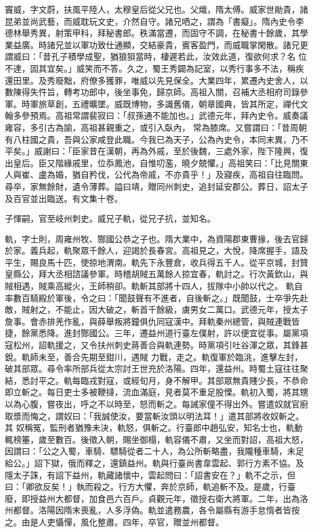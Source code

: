 \begin{pinyinscope}
 竇威，字文蔚，扶風平陸人，太穆皇后從父兄也。父熾，隋太傅。威家世勛貴，諸昆弟並尚武藝，而威耽玩文史，介然自守。諸兄哂之，謂為「書癡」。隋內史令李德林舉秀異，射策甲科，拜秘書郎。秩滿當遷，而固守不調，在秘書十餘歲，其學業益廣。時諸兄並以軍功致仕通顯，交結豪貴，賓客盈門，而威職掌閑散。諸兄更謂威曰：「昔孔子積學成聖，猶狼狽當時，棲遲若此，汝效此道，復欲何求？名
 位不達，固其宜矣。」威笑而不答。久之，蜀王秀闢為記室，以秀行事多不法，稱疾還田里。及秀廢黜，府僚多獲罪，唯威以先見保全。大業四年，累遷內史舍人，以數陳得失忤旨，轉考功郎中，後坐事免，歸京師。高祖入關，召補大丞相府司錄參軍。時軍旅草創，五禮曠墜。威既博物，多識舊儀，朝章國典，皆其所定，禪代文翰多參預焉。高祖常謂裴寂曰：「叔孫通不能加也。」武德元年，拜內史令。威奏議雍容，多引古為諭，高祖甚親重之，或引入臥內，
 常為膝席。又嘗謂曰：「昔周朝有八柱國之貴，吾與公家咸登此職。今我已為天子，公為內史令，本同末異，乃不平矣。」威謝曰：「臣家昔在漢朝，再為外戚，至於後魏，三處外家，陛下隆興，復出皇后。臣又階緣戚里，位忝鳳池，自惟叨濫，曉夕兢懼。」高祖笑曰：「比見關東人與崔、盧為婚，猶自矜伐，公代為帝戚，不亦貴乎！」及寢疾，高祖自往臨問。尋卒，家無餘財，遺令薄葬。謚曰靖，贈同州刺史，追封延安郡公。葬日，詔太子及百官並出臨送。有文集十卷。



 子惲嗣，官至岐州刺史。威兄子軌，從兄子抗，並知名。



 軌，字士則，周雍州牧、酂國公恭之子也。隋大業中，為資陽郡東曹掾，後去官歸於家。義兵起，軌聚眾千餘人，迎謁於長春宮。高祖見之，大悅，降席握手，語及平生，賜良馬十匹，使掠地渭南。軌先下永豐倉，收兵得五千人。從平京城，封贊皇縣公，拜大丞相諮議參軍。時稽胡賊五萬餘人掠宜春，軌討之。行次黃欽山，與賊相遇，賊乘高縱火，王師稍卻。軌斬其部將十四人，拔隊中小帥以代之。
 軌自率數百騎殿於軍後，令之曰：「聞鼓聲有不進者，自後斬之。」既聞鼓，士卒爭先赴敵，賊射之，不能止，因大破之，斬首千餘級，虜男女二萬口。武德元年，授太子詹事。會赤排羌作亂，與薛舉叛將鐘俱仇同寇漢中。拜軌秦州總管，與賊連戰皆捷，餘黨悉降。進封酂國公。三年，遷益州道行臺左僕射，許以便宜從事。屬黨項寇松州，詔軌援之，又令扶州刺史蔣善合與軌連勢。時黨項引吐谷渾之眾，其鋒甚銳。軌師未至，善合先期至鉗川，遇賊
 力戰，走之。軌復軍於臨洮，進擊左封，破其部眾。尋令率所部兵從太宗討王世充於洛陽。四年，還益州。時蜀土寇往往聚結，悉討平之。軌每臨戎對寇，或經旬月，身不解甲。其部眾無貴賤少長，不恭命即立斬之。每日吏士多被鞭撻，流血滿庭，見者莫不重足股慄。軌初入蜀，將其甥以為心腹，嘗夜出，呼之不以時至，怒而斬之。每誡家僮不得出外。嘗遣奴就官廚取漿而悔之，謂奴曰：「我誠使汝，要當斬汝頭以明法耳！」遣其部將收奴斬之。其
 奴稱冤，監刑者猶豫未決，軌怒，俱斬之。行臺郎中趙弘安，知名士也，軌動輒榜箠，歲至數百。後徵入朝，賜坐御榻，軌容儀不肅，又坐而對詔，高祖大怒，因謂曰：「公之入蜀，車騎、驃騎從者二十人，為公所斬略盡，我隴種車騎，未足給公。」詔下獄，俄而釋之，還鎮益州。軌與行臺尚書韋雲起、郭行方素不協。及隱太子誅，有詔下益州，軌藏諸懷中，雲起問曰：「詔書安在？」軌不之示，但曰：「卿欲反矣！」執而殺之。行方大懼，奔於京師，軌追斬不及。是歲，行臺
 廢，即授益州大都督，加食邑六百戶。貞觀元年，徵授右衛大將軍。二年，出為洛州都督。洛陽因隋末喪亂，人多浮偽。軌並遣務農，各令屬縣有游手怠惰者皆按之。由是人吏懾憚，風化整肅。四年，卒官，贈並州都督。




\end{pinyinscope}
